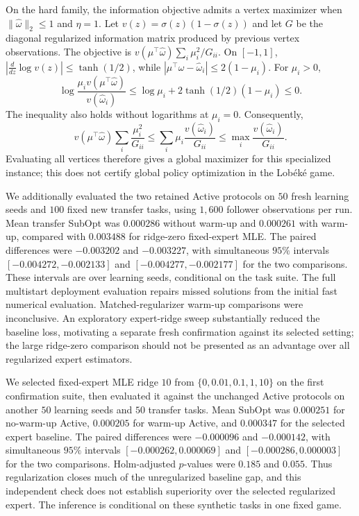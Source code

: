 On the hard family, the information objective admits a vertex maximizer when
$\lVert\hat\omega\rVert_2\leq1$ and $\eta=1$. Let
$v(z)=\sigma(z)(1-\sigma(z))$ and let $G$ be the diagonal regularized information
matrix produced by previous vertex observations. The objective is
$v(\mu^\top\hat\omega)\sum_i\mu_i^2/G_{ii}$.
On $[-1,1]$, $|\frac{d}{dz}\log v(z)|\leq\tanh(1/2)$, while
$|\mu^\top\hat\omega-\hat\omega_i|\leq2(1-\mu_i)$. For $\mu_i>0$,
\begin{equation*}
\log\frac{\mu_i v(\mu^\top\hat\omega)}{v(\hat\omega_i)}\leq\log\mu_i+2\tanh(1/2)(1-\mu_i)\leq0.
\end{equation*}
The inequality also holds without logarithms at $\mu_i=0$. Consequently,
\begin{equation*}
v(\mu^\top\hat\omega)\sum_i\frac{\mu_i^2}{G_{ii}}\leq\sum_i\mu_i\frac{v(\hat\omega_i)}{G_{ii}}\leq\max_i\frac{v(\hat\omega_i)}{G_{ii}}.
\end{equation*}
Evaluating all vertices therefore gives a global maximizer for this specialized
instance; this does not certify global policy optimization in the Lob\'ek\'e game.

We additionally evaluated the two retained Active protocols on $50$ fresh
learning seeds and $100$ fixed new transfer tasks, using $1{,}600$ follower
observations per run. Mean transfer SubOpt was $0.000286$ without warm-up and
$0.000261$ with warm-up, compared with $0.003488$ for ridge-zero fixed-expert MLE.
The paired differences were $-0.003202$ and $-0.003227$, with simultaneous
$95\%$ intervals $[-0.004272,-0.002133]$ and $[-0.004277,-0.002177]$ for the two
comparisons. These intervals are over learning seeds, conditional on the task
suite. The full multistart deployment evaluation repairs missed solutions from
the initial fast numerical evaluation. Matched-regularizer warm-up comparisons
were inconclusive. An exploratory expert-ridge sweep substantially reduced the
baseline loss, motivating a separate fresh confirmation against its selected
setting; the large ridge-zero comparison should not be presented as an advantage
over all regularized expert estimators.

We selected fixed-expert MLE ridge $10$ from $\{0,0.01,0.1,1,10\}$ on the first
confirmation suite, then evaluated it against the unchanged Active protocols
on another $50$ learning seeds and $50$ transfer tasks. Mean SubOpt was
$0.000251$ for no-warm-up Active, $0.000205$ for warm-up Active, and $0.000347$
for the selected expert baseline. The paired differences were $-0.000096$
and $-0.000142$, with simultaneous $95\%$ intervals
$[-0.000262,0.000069]$ and $[-0.000286,0.000003]$ for the two comparisons.
Holm-adjusted $p$-values were $0.185$ and $0.055$. Thus regularization closes
much of the unregularized baseline gap, and this independent check does not
establish superiority over the selected regularized expert. The inference is
conditional on these synthetic tasks in one fixed game.
